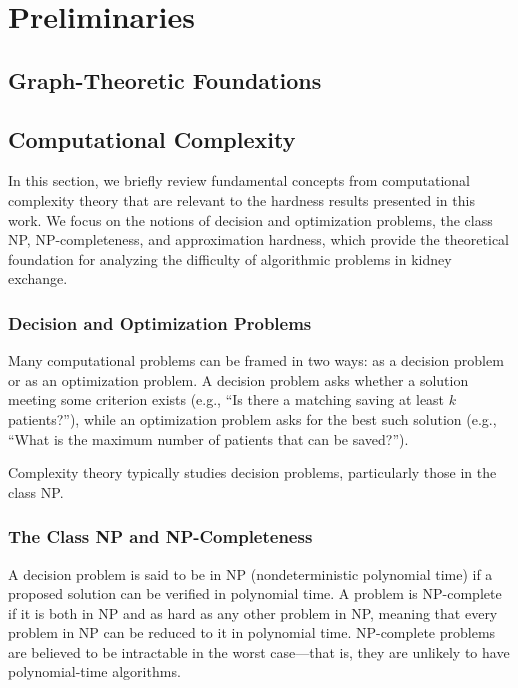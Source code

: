 \chapter{Preliminaries}
\label{cha:preliminaries}


\section{Graph-Theoretic Foundations}


\section{Computational Complexity}
\label{sec:computational_complexity}

In this section, we briefly review fundamental concepts from computational complexity theory that are relevant to the hardness results presented in this work. We focus on the notions of decision and optimization problems, the class NP, NP-completeness, and approximation hardness, which provide the theoretical foundation for analyzing the difficulty of algorithmic problems in kidney exchange.

\subsection*{Decision and Optimization Problems}

Many computational problems can be framed in two ways: as a decision problem or as an optimization problem. A decision problem asks whether a solution meeting some criterion exists (e.g., “Is there a matching saving at least $k$ patients?”), while an optimization problem asks for the best such solution (e.g., “What is the maximum number of patients that can be saved?”).

Complexity theory typically studies decision problems, particularly those in the class NP.

\subsection*{The Class NP and NP-Completeness}

A decision problem is said to be in NP (nondeterministic polynomial time) if a proposed solution can be verified in polynomial time. A problem is NP-complete if it is both in NP and as hard as any other problem in NP, meaning that every problem in NP can be reduced to it in polynomial time. NP-complete problems are believed to be intractable in the worst case—that is, they are unlikely to have polynomial-time algorithms.

